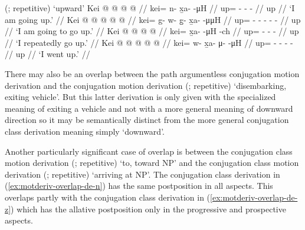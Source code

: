\documentclass[12pt,letterpaper,oneside,article]{memoir}
\begin{document}
\pex\label{ex:motderiv-overlap-kei-z}%
\a\label{ex:motderiv-overlap-kei-z-motderiv}%
%
	 (;  repetitive) ‘upward’
\a\label{ex:motderiv-overlap-kei-z-prog}%
%
\begingl
	\gla	Kei @  @ {} @ {} @ {} //
	\glb	kei= n- x̱a-  -μH //
	\glc	up= - -  - //
	\gld	up\•  {} {} {} //
	\glft	‘I am going up.’
		//
\endgl
\a\label{ex:motderiv-overlap-kei-z-prosp}%
%
\begingl
	\gla	Kei  @ {} @ {} @ {} @ {} @ {} //
	\glb	kei= g- w- g̱- x̱a-  -μμH //
	\glc	up= - - - -  - //
	\gld	up\•  {} {} {} {} {} //
	\glft	‘I am going to go up.’
		//
\endgl
\a\label{ex:motderiv-overlap-nopath-z-repimpfv}%
%
\begingl
	\gla	Kei @  @ {} @ {} @ {} //
	\glb	kei= x̱a-  -μH -ch //
	\glc	up= -  - - //
	\gld	up\•  {} {} {} //
	\glft	‘I repeatedly go up.’
		//
\endgl
\a\label{ex:motderiv-overlap-kei-z-pfv}%
%
\begingl
	\gla	Kei @  @ {} @ {} @ {} @ {} //
	\glb	kei= w- x̱a- μ-  -μH //
	\glc	up= - - -  - //
	\gld	up  {} {} {} {} //
	\glft	‘I went up.’
		//
\endgl
\xe

There may also be an overlap between the path argumentless  conjugation motion derivation and the  conjugation motion derivation  (;  repetitive) ‘disembarking, exiting vehicle’.
But this latter derivation is only given with the specialized meaning of exiting a vehicle and not with a more general meaning of downward direction \parencite[297]{leer:1991} so it may be semantically distinct from the more general  conjugation class derivation meaning simply ‘downward’.

Another particularly significant case of overlap is between the  conjugation class motion derivation  (;  repetitive) ‘to, toward NP’ and the  conjugation class motion derivation  (;  repetitive) ‘arriving at NP’.
The  conjugation class derivation in (\ref{ex:motderiv-overlap-de-n}) has the same postposition in all aspects.
This overlaps partly with the  conjugation class derivation in (\ref{ex:motderiv-overlap-de-z}) which has the allative postposition  only in the progressive and prospective aspects.
\end{document}
